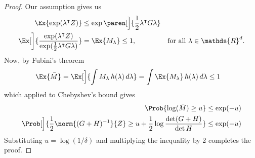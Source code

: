 \documentclass{article}
\newcommand{\defeq}{\coloneq}
\newcommand{\inv}[1]{#1^{-1}}
\newcommand{\Real}{\mathds{R}}
\DeclarePairedDelimiter{\paren}()
\DeclarePairedDelimiter{\brck}{[}{]}
\newcommand{\transp}[1]{#1^\intercal}
\begin{document}
\begin{lemma}
\begin{proof}
    Our assumption gives us
    \begin{align*}
      \Ex{\exp(\transp{\lambda}Z)} &\le \exp\paren[\Big]{\frac{1}{2}\transp{\lambda}G\lambda} \\
      \Ex[\bigg]{\frac{\exp(\transp{\lambda}Z)}{\exp(\frac{1}{2}\transp{\lambda}G\lambda)}}
      &= \Ex{M_\lambda} \le 1, &\text{for all }\lambda\in\Real^d.
    \end{align*}
    Now, by Fubini's theorem
    \begin{align*}
      \Ex{\bar{M}} &= \Ex[\Big]{\int M_\lambda\,h(\lambda)\,d\lambda} = \int \Ex{M_\lambda} \,h(\lambda)\,d\lambda \le 1
    \end{align*}
    which applied to Chebyshev's bound gives
    \begin{align*}
      \Prob{\log(\bar{M}) \ge u} &\le \exp(-u) \\
      \Prob[\Big]{\frac{1}{2}\norm{\inv{(G+H)}}{Z} \ge u + \frac{1}{2}\log\frac{\det(G+H)}{\det H}} &\le \exp(-u)
    \end{align*}
    Substituting $u = \log(1/\delta)$ and multiplying the inequality
    by 2 completes the proof.
  \end{proof}

\end{lemma}


\end{document}
